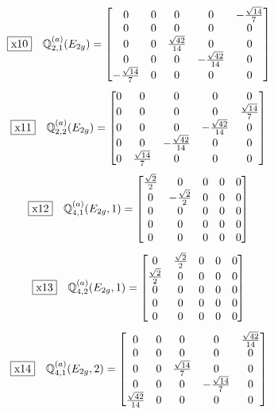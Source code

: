 \documentclass[fleqn,10pt,landscape]{jsarticle}
\begin{document}
\begin{dmath*}
\fbox{x10}\quad \mathbb{Q}_{2,1}^{(a)}(E_{2g})=\begin{bmatrix} 0 & 0 & 0 & 0 & - \frac{\sqrt{14}}{7} \\ 0 & 0 & 0 & 0 & 0 \\ 0 & 0 & \frac{\sqrt{42}}{14} & 0 & 0 \\ 0 & 0 & 0 & - \frac{\sqrt{42}}{14} & 0 \\ - \frac{\sqrt{14}}{7} & 0 & 0 & 0 & 0 \end{bmatrix}
\end{dmath*}
\begin{dmath*}
\fbox{x11}\quad \mathbb{Q}_{2,2}^{(a)}(E_{2g})=\begin{bmatrix} 0 & 0 & 0 & 0 & 0 \\ 0 & 0 & 0 & 0 & \frac{\sqrt{14}}{7} \\ 0 & 0 & 0 & - \frac{\sqrt{42}}{14} & 0 \\ 0 & 0 & - \frac{\sqrt{42}}{14} & 0 & 0 \\ 0 & \frac{\sqrt{14}}{7} & 0 & 0 & 0 \end{bmatrix}
\end{dmath*}
\begin{dmath*}
\fbox{x12}\quad \mathbb{Q}_{4,1}^{(a)}(E_{2g},1)=\begin{bmatrix} \frac{\sqrt{2}}{2} & 0 & 0 & 0 & 0 \\ 0 & - \frac{\sqrt{2}}{2} & 0 & 0 & 0 \\ 0 & 0 & 0 & 0 & 0 \\ 0 & 0 & 0 & 0 & 0 \\ 0 & 0 & 0 & 0 & 0 \end{bmatrix}
\end{dmath*}
\begin{dmath*}
\fbox{x13}\quad \mathbb{Q}_{4,2}^{(a)}(E_{2g},1)=\begin{bmatrix} 0 & \frac{\sqrt{2}}{2} & 0 & 0 & 0 \\ \frac{\sqrt{2}}{2} & 0 & 0 & 0 & 0 \\ 0 & 0 & 0 & 0 & 0 \\ 0 & 0 & 0 & 0 & 0 \\ 0 & 0 & 0 & 0 & 0 \end{bmatrix}
\end{dmath*}
\begin{dmath*}
\fbox{x14}\quad \mathbb{Q}_{4,1}^{(a)}(E_{2g},2)=\begin{bmatrix} 0 & 0 & 0 & 0 & \frac{\sqrt{42}}{14} \\ 0 & 0 & 0 & 0 & 0 \\ 0 & 0 & \frac{\sqrt{14}}{7} & 0 & 0 \\ 0 & 0 & 0 & - \frac{\sqrt{14}}{7} & 0 \\ \frac{\sqrt{42}}{14} & 0 & 0 & 0 & 0 \end{bmatrix}
\end{dmath*}
\end{document}
